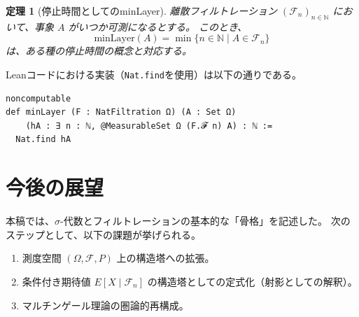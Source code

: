 \documentclass[a4paper,11pt]{article}
\theoremstyle{definition}
\theoremstyle{plain}
\newtheorem{theorem}[definition]{定理}
\begin{document}
\begin{theorem}[停止時間としてのminLayer]
離散フィルトレーション $(\mathcal{F}_n)_{n \in \mathbb{N}}$ において、事象 $A$ がいつか可測になるとする。
このとき、
\[ \mathrm{minLayer}(A) = \min \{ n \in \mathbb{N} \mid A \in \mathcal{F}_n \} \]
は、ある種の停止時間の概念と対応する。
\end{theorem}

Leanコードにおける実装（\texttt{Nat.find}を使用）は以下の通りである。

\begin{lstlisting}[caption=minLayerの実装]
noncomputable
def minLayer (F : NatFiltration Ω) (A : Set Ω)
    (hA : ∃ n : ℕ, @MeasurableSet Ω (F.𝓕 n) A) : ℕ :=
  Nat.find hA
\end{lstlisting}

\section{今後の展望}
本稿では、$\sigma$-代数とフィルトレーションの基本的な「骨格」を記述した。
次のステップとして、以下の課題が挙げられる。
\begin{enumerate}
    \item 測度空間 $(\Omega, \mathcal{F}, P)$ 上の構造塔への拡張。
    \item 条件付き期待値 $E[X \mid \mathcal{F}_n]$ の構造塔としての定式化（射影としての解釈）。
    \item マルチンゲール理論の圏論的再構成。
\end{enumerate}
\end{document}
